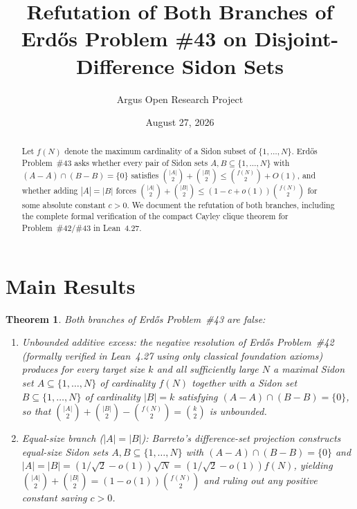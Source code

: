 \documentclass[10pt,reqno]{amsart}
\title[Disjoint-Difference Sidon Sets and Erd\H{o}s Problem \#43]
{Refutation of Both Branches of Erd\H{o}s Problem \#43 on Disjoint-Difference Sidon Sets}
\author{Argus Open Research Project}
\date{August 27, 2026}
\newtheorem{theorem}{Theorem}[section]
\theoremstyle{definition}
\begin{document}
\begin{abstract}
Let $f(N)$ denote the maximum cardinality of a Sidon subset of $\{1,\dots,N\}$. Erd\H{o}s Problem~\#43 asks whether every pair of Sidon sets $A,B\subseteq\{1,\dots,N\}$ with $(A-A)\cap(B-B)=\{0\}$ satisfies $\binom{|A|}{2}+\binom{|B|}{2}\le\binom{f(N)}{2}+O(1)$, and whether adding $|A|=|B|$ forces $\binom{|A|}{2}+\binom{|B|}{2}\le(1-c+o(1))\binom{f(N)}{2}$ for some absolute constant $c>0$. We document the refutation of both branches, including the complete formal verification of the compact Cayley clique theorem for Problem~\#42/\#43 in Lean~4.27.
\end{abstract}
\maketitle
\section{Main Results}
\begin{theorem}
Both branches of Erd\H{o}s Problem~\#43 are false:
\begin{enumerate}[label=\textup{(\arabic*)}]
  \item \emph{Unbounded additive excess:} the negative resolution of Erd\H{o}s Problem~\#42 (formally verified in Lean~4.27 using only classical foundation axioms) produces for every target size $k$ and all sufficiently large $N$ a maximal Sidon set $A\subseteq\{1,\dots,N\}$ of cardinality $f(N)$ together with a Sidon set $B\subseteq\{1,\dots,N\}$ of cardinality $|B|=k$ satisfying $(A-A)\cap(B-B)=\{0\}$, so that $\binom{|A|}{2}+\binom{|B|}{2}-\binom{f(N)}{2}=\binom{k}{2}$ is unbounded.
  \item \emph{Equal-size branch ($|A|=|B|$):} Barreto's difference-set projection constructs equal-size Sidon sets $A,B\subseteq\{1,\dots,N\}$ with $(A-A)\cap(B-B)=\{0\}$ and $|A|=|B|=(1/\sqrt{2}-o(1))\sqrt{N} = (1/\sqrt{2}-o(1))f(N)$, yielding $\binom{|A|}{2}+\binom{|B|}{2} = (1-o(1))\binom{f(N)}{2}$ and ruling out any positive constant saving $c>0$.
\end{enumerate}
\end{theorem}
\end{document}
